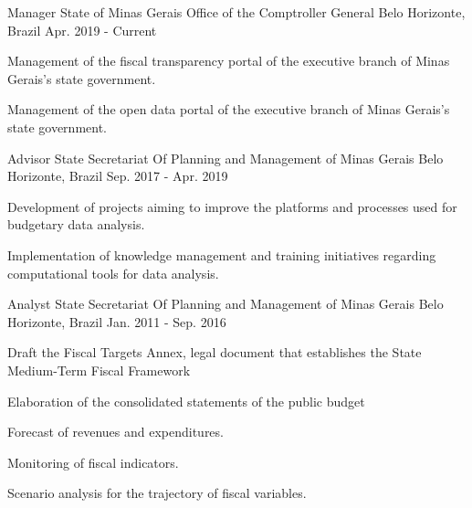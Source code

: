 \begin{cventries}

    \cventry
    {Manager}
    {State of Minas Gerais Office of the Comptroller General}
    {Belo Horizonte, Brazil}
    {Apr. 2019 - Current}
    {
      \begin{cvitems}
        \item {Management of the fiscal transparency portal of the executive branch of Minas Gerais's state government.}
        \item {Management of the open data portal of the executive branch of Minas Gerais's state government.}
      \end{cvitems}
    }

    \cventry
    {Advisor}
    {State Secretariat Of Planning and Management of Minas Gerais}
    {Belo Horizonte, Brazil}
    {Sep. 2017 - Apr. 2019}
    {
      \begin{cvitems}
        \item {Development of projects aiming to improve the platforms and processes used for budgetary data analysis.}
        \item {Implementation of knowledge management and training initiatives regarding computational tools for data analysis.}
      \end{cvitems}
    }

  \cventry
    {Analyst}
    {State Secretariat Of Planning and Management of Minas Gerais}
    {Belo Horizonte, Brazil}
    {Jan. 2011 - Sep. 2016}
    {
      \begin{cvitems}
        \item {Draft the Fiscal Targets Annex, legal document that establishes the State Medium-Term Fiscal Framework}
        \item {Elaboration of the consolidated statements of the public budget}
        \item {Forecast of revenues and expenditures.}
        \item {Monitoring of fiscal indicators.}
        \item {Scenario analysis for the trajectory of fiscal variables.}
      \end{cvitems}
    }
\end{cventries}
